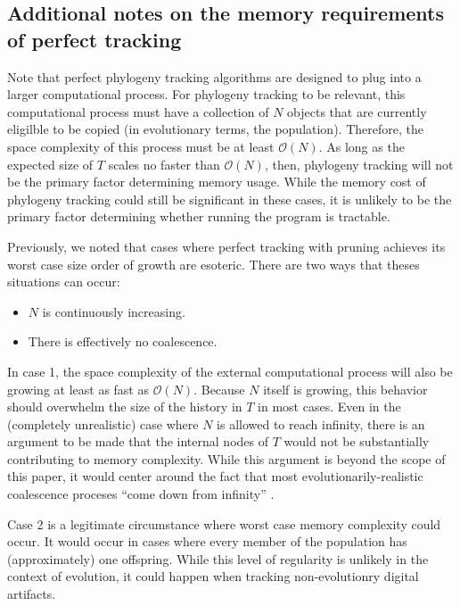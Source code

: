 \subsection{Additional notes on the memory requirements of perfect tracking} \label{sec:perfect-tracking-space-supp}

Note that perfect phylogeny tracking algorithms are designed to plug into a larger computational process.
For phylogeny tracking to be relevant, this computational process must have a collection of $N$ objects that are currently eligilble to be copied (in evolutionary terms, the population).
Therefore, the space complexity of this process must be at least $\mathcal{O}(N)$.
As long as the expected size of $T$ scales no faster than $\mathcal{O}(N)$, then, phylogeny tracking will not be the primary factor determining memory usage.
While the memory cost of phylogeny tracking could still be significant in these cases, it is unlikely to be the primary factor determining whether running the program is tractable.

Previously, we noted that cases where perfect tracking with pruning achieves its worst case size order of growth are esoteric.
There are two ways that theses situations can occur:

\begin{itemize}
\item $N$ is continuously increasing.
\item There is effectively no coalescence.
\end{itemize}

In case 1, the space complexity of the external computational process will also be growing at least as fast as $\mathcal{O}(N)$.
Because $N$ itself is growing, this behavior should overwhelm the size of the history in $T$ in most cases.
Even in the (completely unrealistic) case where $N$ is allowed to reach infinity, there is an argument to be made that the internal nodes of $T$ would not be substantially contributing to memory complexity.
While this argument is beyond the scope of this paper, it would center around the fact that most evolutionarily-realistic coalescence proceses ``come down from infinity'' \citep{berestyckiRecentProgressCoalescent2009}.

Case 2 is a legitimate circumstance where worst case memory complexity could occur. 
It would occur in cases where every member of the population has (approximately) one offspring.
While this level of regularity is unlikely in the context of evolution, it could happen when tracking non-evolutionry digital artifacts.